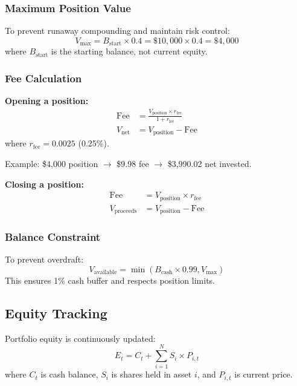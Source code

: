 \documentclass[12pt,a4paper]{article}
\begin{document}
\subsubsection{Maximum Position Value}
To prevent runaway compounding and maintain risk control:
\begin{equation}
    V_{\text{max}} = B_{\text{start}} \times 0.4 = \$10,000 \times 0.4 = \$4,000
\end{equation}
where $B_{\text{start}}$ is the starting balance, not current equity.

\subsubsection{Fee Calculation}
\textbf{Opening a position:}
\begin{align}
    \text{Fee} &= \frac{V_{\text{position}} \times r_{\text{fee}}}{1 + r_{\text{fee}}} \\
    V_{\text{net}} &= V_{\text{position}} - \text{Fee}
\end{align}
where $r_{\text{fee}} = 0.0025$ (0.25\%).

Example: \$4,000 position $\rightarrow$ \$9.98 fee $\rightarrow$ \$3,990.02 net invested.

\textbf{Closing a position:}
\begin{align}
    \text{Fee} &= V_{\text{position}} \times r_{\text{fee}} \\
    V_{\text{proceeds}} &= V_{\text{position}} - \text{Fee}
\end{align}

\subsubsection{Balance Constraint}
To prevent overdraft:
\begin{equation}
    V_{\text{available}} = \min(B_{\text{cash}} \times 0.99, V_{\text{max}})
\end{equation}
This ensures 1\% cash buffer and respects position limits.

\subsection{Equity Tracking}
Portfolio equity is continuously updated:
\begin{equation}
    E_t = C_t + \sum_{i=1}^{N} S_i \times P_{i,t}
\end{equation}
where $C_t$ is cash balance, $S_i$ is shares held in asset $i$, and $P_{i,t}$ is current price.
\end{document}
